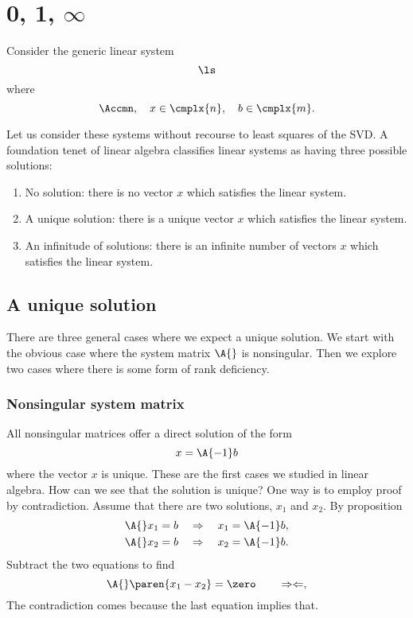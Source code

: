 \section{0, 1, $\infty$}
Consider the generic linear system
\begin{equation*}
  \ls
\end{equation*}
where
\begin{equation}
  \Accmn, \quad x\in\cmplx{n}, \quad b\in\cmplx{m}.
\end{equation}

Let us consider these systems without recourse to least squares of the SVD.
A foundation tenet of linear algebra classifies linear systems as having three possible solutions:
\begin{enumerate}
\item No solution: there is no vector $x$ which satisfies the linear system.
\item A unique solution: there is a unique vector $x$ which satisfies the linear system.
\item An infinitude of solutions: there is an infinite number of vectors $x$ which satisfies the linear system.
\end{enumerate}

\subsection{A unique solution}
There are three general cases where we expect a unique solution. We start with the obvious case where the system matrix $\A{}$ is nonsingular. Then we explore two cases where there is some form of rank deficiency.

\subsubsection{Nonsingular system matrix}
All nonsingular matrices offer a direct solution of the form
\begin{equation}
  x = \A{-1}b
\end{equation}
where the vector $x$ is unique. These are the first cases we studied in linear algebra. How can we see that the solution is unique? One way is to employ proof by contradiction. Assume that there are two solutions, $x_{1}$ and $x_{2}$. By proposition
\begin{equation}
  \begin{split}
    \A{}x_{1} & = b \quad \Rightarrow \quad x_{1} = \A{-1}b, \\
    \A{}x_{2} & = b \quad \Rightarrow \quad x_{2} = \A{-1}b.
  \end{split}
\end{equation}
Subtract the two equations to find
\begin{equation}
  \A{}\paren{x_{1} - x_{2}} = \zero \qquad  \Rightarrow\Leftarrow,
\end{equation}
The contradiction comes because the last equation implies that.

